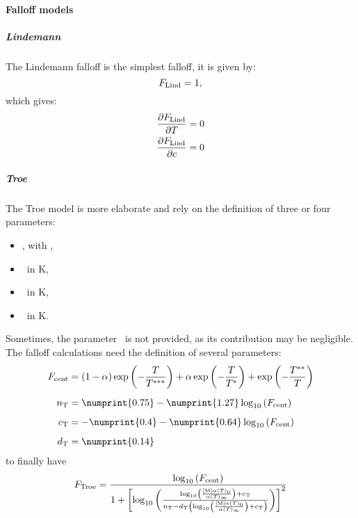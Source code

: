 \paragraph{Falloff models}
\subparagraph{Lindemann}
The Lindemann falloff is the simplest falloff, it is given by:
\begin{equation}
F_\text{Lind} = 1,
\label{Falloff:Lindeman}
\end{equation}
which gives:
\begin{equation}
\begin{split}
\doverdT{\FLind} & = 0 \\
\doverdc{\FLind} & = 0 \\
\end{split}
\label{Falloff:Lindemann:diff}
\end{equation}

\subparagraph{Troe}
The Troe model is more elaborate and rely on the definition of three or
four parameters:
\begin{itemize}
\item \Troealpha, with \nounit,
\item \TroeTone\ in \unit{K},
\item \TroeTtwo\ in \unit{K},
\item \TroeTthree\ in \unit{K}.
\end{itemize}
Sometimes, the parameter \TroeTtwo\ is not provided, as its contribution
may be negligible.
The falloff calculations need the definition of several parameters:
\begin{equation}
\begin{split}
\TroeFcent & = \left(1 - \Troealpha\right)\exp\left(-\frac{\Temp}{\TroeTthree}\right)
              +          \Troealpha       \exp\left(-\frac{\Temp}{\TroeTone}\right)
              +                           \exp\left(-\frac{\TroeTtwo}{\Temp}\right) \\[5pt]
\Troen     & =   \numprint{0.75} - \numprint{1.27}\log_{10}\left(\TroeFcent\right)  \\[5pt]
\Troec     & = - \numprint{0.4}  - \numprint{0.64}\log_{10}\left(\TroeFcent\right)  \\[5pt]
\Troed     & =   \numprint{0.14}
\end{split}
\label{Troe:parameter}
\end{equation}
to finally have
\newcommand{\pr}{\ensuremath{\log_{10}\left(\frac{\conc[M]\kinMod_0}{\kinMod_\infty}\right)}}
\begin{equation}
\FTroe = \frac{\log_{10}\left(\TroeFcent\right)}
              {1 + \left[
                        \log_{10}\left(
                                        \frac{\pr + \Troec}
                                             {\Troen - \Troed\left(
                                                                \pr + \Troec
                                                            \right)}
                                 \right) 
                   \right]^2}
\label{Troe:F}
\end{equation}
